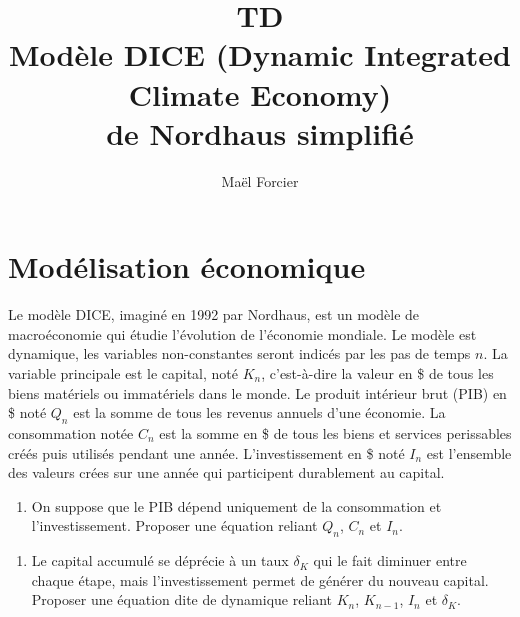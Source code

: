 \documentclass[12pt]{article}
\title{TD \\Modèle 
DICE (Dynamic Integrated Climate Economy) \\
de Nordhaus simplifié }
\author{Maël Forcier}
\newcommand{\rep}[1]{\textit{Réponse :} #1 \\}
\renewcommand{\rep}[1]{ }
\theoremstyle{remark}
\begin{document}
\maketitle


\section{Modélisation économique}

Le modèle DICE, imaginé en 1992 par Nordhaus, est un modèle de macroéconomie qui étudie l'évolution de l'économie mondiale.
Le modèle est dynamique, les variables non-constantes seront indicés par les pas de temps $n$.
La variable principale est le capital, noté $K_n$, c'est-à-dire la valeur en \$ de tous les biens matériels ou immatériels dans le monde.
Le produit intérieur brut (PIB) en \$ noté $Q_n$ est la somme de tous les revenus annuels d'une économie.
La consommation notée $C_n$ est la somme en \$ de tous les biens et services perissables créés puis utilisés pendant une année.
L'investissement en \$ noté $I_n$ est l'ensemble des valeurs crées sur une année qui participent durablement au capital.

\begin{enumerate}
\item On suppose que le PIB dépend uniquement de la consommation et l'investissement. Proposer une équation reliant $Q_n$, $C_n$ et $I_n$.
\end{enumerate}
\rep{ $Q_{n}=C_n + I_n$ }
\begin{enumerate}[resume]
\item  Le capital accumulé se déprécie à un taux $\delta_K$ qui le fait diminuer entre chaque étape, mais l'investissement permet de générer du nouveau capital. Proposer une équation dite de dynamique reliant $K_{n}$, $K_{n-1}$, $I_n$ et $\delta_K$.
\end{enumerate}
\rep{ $K_{n}=(1-\delta_K)K_{n-1}+I_n$ }
\end{document}
